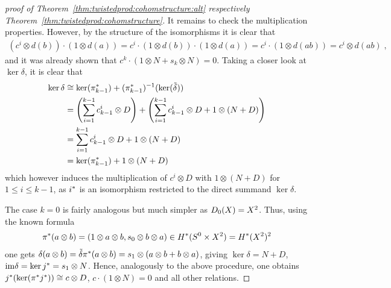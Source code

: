 \begin{proof}[proof of
  Theorem~\ref{thm:twistedprod:cohomstructure:alt}
  respectively Theorem~\ref{thm:twistedprod:cohomstructure}]
  It remains to check the multiplication properties.
  However, by the structure of the isomorphisms it is clear that
  \begin{gather*}
    (c^i\otimes d(b))\cdot (1\otimes d(a))
    = c^i\cdot (1\otimes d(b))\cdot (1\otimes d(a))
    = c^i\cdot (1\otimes d(ab))
    = c^i\otimes d(ab)
    \;,
  \end{gather*}
  and it was already shown that
  $c^k\cdot (1\otimes N + s_k\otimes N)=0$.
  Taking a closer look at $\ker\delta$, it is clear that
  \begin{align*}
    \ker\delta
    &\cong \ker({\pi}^*_{k-1})
    + ({\pi}^*_{k-1})^{-1}(\ker(\tilde\delta)) \\
    &= \left(\sum_{i=1}^{k-1} c_{k-1}^i \otimes D \right)
    + \left(\sum_{i=1}^{k-1} c_{k-1}^i \otimes D
      + 1\otimes(N+D)
      \right) \\
    &= \sum_{i=1}^{k-1} c_{k-1}^i \otimes D
      + 1\otimes(N+D) \\
    &= \ker({\pi}^*_{k-1}) + 1\otimes(N+D)
  \end{align*}
  which however induces the multiplication of $c^i\otimes D$ with
  $1\otimes(N+D)$ for $1\leq i\leq k-1$, as ${i}^*$ is an isomorphism
  restricted to the direct summand $\ker\delta$.

  The case $k=0$ is fairly analogous but much simpler as
  $D_{0}({X})=X^2$. Thus, using the known formula
  \begin{gather*}
    {\pi}^*(a\otimes b)=(1\otimes a\otimes b, s_0\otimes b\otimes a)
    \in H^*(S^0\times X^2)=H^*(X^2)^2
  \end{gather*}
  one gets
  $\delta(a\otimes b)
  = \tilde\delta{\pi}^*(a\otimes b)
  = s_1\otimes(a\otimes b + b\otimes a)$, giving
  $\ker\delta=N+D$, $\mathrm{im}\delta = \ker{j}^* = s_1\otimes N$.
  Hence, analogously to the above procedure, one obtains
  ${j}^* (\ker({\pi}^*{j}^*)) \cong c\otimes D$,
  $c\cdot (1\otimes N) = 0$ and all other relations.
\end{proof}


